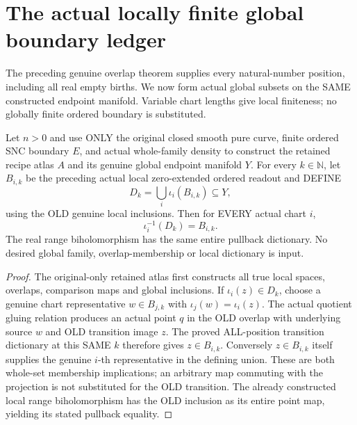 \section{The actual locally finite global boundary ledger}

The preceding genuine overlap theorem supplies every natural-number
position, including all real empty births. We now form actual global
subsets on the SAME constructed endpoint manifold. Variable chart lengths
give local finiteness; no globally finite ordered boundary is substituted.

\begin{theorem}
\label{hir:sharp-actual-global-birth-boundary-local-dictionary}
\leanok
Let $n>0$ and use ONLY the original closed smooth pure curve, finite ordered
SNC boundary $E$, and actual whole-family density to construct the retained
recipe atlas $A$ and its genuine global endpoint manifold $Y$.
For every $k\in\mathbb N$, let $B_{i,k}$ be the preceding actual local
zero-extended ordered readout and DEFINE
\[
 D_k=\bigcup_i\iota_i(B_{i,k})\subseteq Y,
\]
using the OLD genuine local inclusions. Then for EVERY actual chart $i$,
\[
 \iota_i^{-1}(D_k)=B_{i,k}.
\]
The real range biholomorphism has the same entire pullback dictionary.
No desired global family, overlap-membership or local dictionary is input.
\end{theorem}
\begin{proof}
The original-only retained atlas first constructs all true local spaces,
overlaps, comparison maps and global inclusions. If $\iota_i(z)\in D_k$,
choose a genuine chart representative $w\in B_{j,k}$ with
$\iota_j(w)=\iota_i(z)$. The actual quotient gluing relation produces an
actual point $q$ in the OLD overlap with underlying source $w$ and OLD
transition image $z$. The proved ALL-position transition dictionary at
this SAME $k$ therefore gives $z\in B_{i,k}$. Conversely $z\in B_{i,k}$
itself supplies the genuine $i$-th representative in the defining union.
These are both whole-set membership implications; an arbitrary map
commuting with the projection is not substituted for the OLD transition.
The already constructed local range biholomorphism has the OLD inclusion
as its entire point map, yielding its stated pullback equality.
\end{proof}

